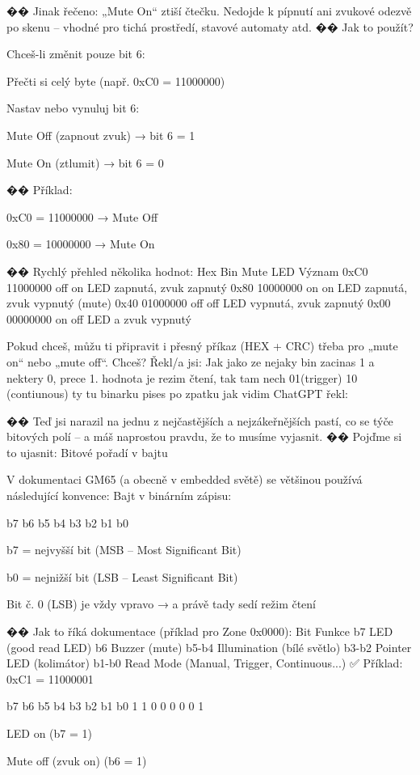 �� Jinak řečeno: „Mute On“ ztiší čtečku.
Nedojde k pípnutí ani zvukové odezvě po skenu – vhodné pro tichá prostředí, stavové automaty atd.
��️ Jak to použít?

Chceš-li změnit pouze bit 6:

    Přečti si celý byte (např. 0xC0 = 11000000)

    Nastav nebo vynuluj bit 6:

        Mute Off (zapnout zvuk) → bit 6 = 1

        Mute On (ztlumit) → bit 6 = 0

�� Příklad:

    0xC0 = 11000000 → Mute Off

    0x80 = 10000000 → Mute On

�� Rychlý přehled několika hodnot:
Hex	Bin	Mute	LED	Význam
0xC0	11000000	off	on	LED zapnutá, zvuk zapnutý
0x80	10000000	on	on	LED zapnutá, zvuk vypnutý (mute)
0x40	01000000	off	off	LED vypnutá, zvuk zapnutý
0x00	00000000	on	off	LED a zvuk vypnutý

Pokud chceš, můžu ti připravit i přesný příkaz (HEX + CRC) třeba pro „mute on“ nebo „mute off“. Chceš?
Řekl/a jsi:
Jak jako ze nejaky bin zacinas 1 a nektery 0, prece 1. hodnota je rezim čtení, tak tam nech 01(trigger) 10 (contiunous) ty tu binarku pises po zpatku jak vidim
ChatGPT řekl:

�� Teď jsi narazil na jednu z nejčastějších a nejzákeřnějších pastí, co se týče bitových polí – a máš naprostou pravdu, že to musíme vyjasnit.
�� Pojďme si to ujasnit: Bitové pořadí v bajtu

V dokumentaci GM65 (a obecně v embedded světě) se většinou používá následující konvence:
Bajt v binárním zápisu:

b7 b6 b5 b4 b3 b2 b1 b0

    b7 = nejvyšší bit (MSB – Most Significant Bit)

    b0 = nejnižší bit (LSB – Least Significant Bit)

    Bit č. 0 (LSB) je vždy vpravo → a právě tady sedí režim čtení

�� Jak to říká dokumentace (příklad pro Zone 0x0000):
Bit	Funkce
b7	LED (good read LED)
b6	Buzzer (mute)
b5-b4	Illumination (bílé světlo)
b3-b2	Pointer LED (kolimátor)
b1-b0	Read Mode (Manual, Trigger, Continuous...)
✅ Příklad: 0xC1 = 11000001

b7 b6 b5 b4 b3 b2 b1 b0
 1  1  0  0  0  0  0  1

    LED on (b7 = 1)

    Mute off (zvuk on) (b6 = 1)

